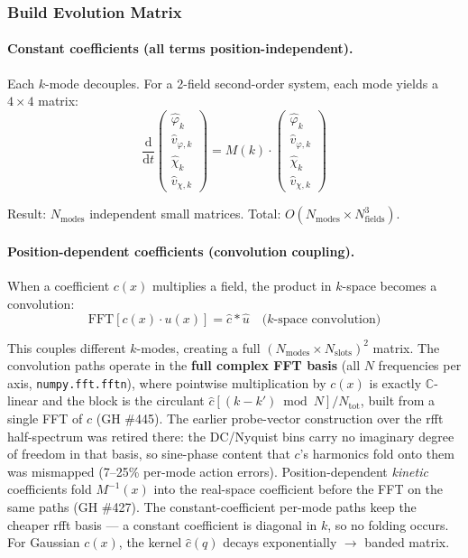 \subsubsection{Build Evolution Matrix}
\label{sec:modal-evolution-matrix}

\paragraph{Constant coefficients (all terms position-independent).}
\label{par:modal-constant}
Each $k$-mode decouples. For a 2-field second-order system, each mode yields a $4\times 4$ matrix:
\begin{equation}
  \frac{\mathrm{d}}{\mathrm{d}t}
  \begin{pmatrix} \hat\varphi_k \\ \hat v_{\varphi,k} \\ \hat\chi_k \\ \hat v_{\chi,k} \end{pmatrix}
  = M(k) \cdot
  \begin{pmatrix} \hat\varphi_k \\ \hat v_{\varphi,k} \\ \hat\chi_k \\ \hat v_{\chi,k} \end{pmatrix}
  \label{eq:modal-per-mode}
\end{equation}

Result: $N_\text{modes}$ independent small matrices. Total: $O(N_\text{modes} \times N_\text{fields}^3)$.

\paragraph{Position-dependent coefficients (convolution coupling).}
\label{par:modal-posdep}
When a coefficient $c(x)$ multiplies a field, the product in $k$-space becomes a convolution:
\begin{equation}
  \text{FFT}[c(x) \cdot u(x)] = \hat{c} * \hat{u} \quad\text{($k$-space convolution)}
  \label{eq:modal-convolution}
\end{equation}

This couples different $k$-modes, creating a full $(N_\text{modes} \times N_\text{slots})^2$ matrix. The convolution paths operate in the \textbf{full complex FFT basis} (all $N$ frequencies per axis, \texttt{numpy.fft.fftn}), where pointwise multiplication by $c(x)$ is exactly $\mathbb{C}$-linear and the block is the circulant $\hat{c}[(k-k') \bmod N]/N_\text{tot}$, built from a single FFT of $c$ (GH \#445). The earlier probe-vector construction over the rfft half-spectrum was retired there: the DC/Nyquist bins carry no imaginary degree of freedom in that basis, so sine-phase content that $c$'s harmonics fold onto them was mismapped (7--25\% per-mode action errors). Position-dependent \emph{kinetic} coefficients fold $M^{-1}(x)$ into the real-space coefficient before the FFT on the same paths (GH \#427). The constant-coefficient per-mode paths keep the cheaper rfft basis --- a constant coefficient is diagonal in $k$, so no folding occurs. For Gaussian $c(x)$, the kernel $\hat{c}(q)$ decays exponentially $\to$ banded matrix.

